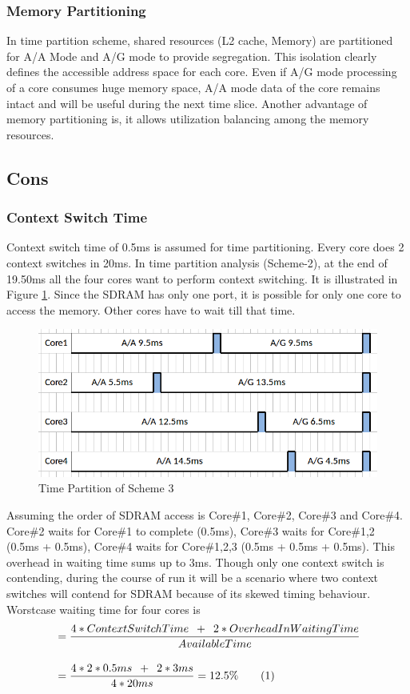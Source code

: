\subsubsection{Memory Partitioning}
In time partition scheme, shared resources (L2 cache, Memory) are partitioned for A/A Mode and A/G mode to provide segregation. This isolation clearly defines the accessible address space for each core. Even if A/G mode processing of a core consumes huge memory space, A/A mode data of the core remains intact and will be useful during the next time slice. Another advantage of memory partitioning is, it allows utilization balancing among the memory resources.

\subsection{Cons}
\label{mm:cons}
\subsubsection{Context Switch Time}
Context switch time of 0.5ms is assumed for time partitioning. Every core does 2 context switches in 20ms. In time partition analysis (Scheme-2), at the end of 19.50ms all the four cores want to perform context switching. It is illustrated in Figure \ref{fig:mm:mm_cons1}. Since the SDRAM has only one port, it is possible for only one core to access the memory. Other cores have to wait till that time. 

\begin{figure}[h!]
	\centering
	\includegraphics[width=120mm]{figures/mm_cons1}
	\caption{Time Partition of Scheme 3}
	\label{fig:mm:mm_cons1}
\end{figure}

Assuming the order of SDRAM access is Core\#1, Core\#2, Core\#3 and Core\#4. Core\#2 waits for Core\#1 to complete (0.5ms), Core\#3 waits for Core\#1,2 (0.5ms + 0.5ms), Core\#4 waits for Core\#1,2,3 (0.5ms + 0.5ms + 0.5ms). This overhead in waiting time sums up to 3ms. Though only one context switch is contending, during the course of run it will be a scenario where two context switches will contend for SDRAM because of its skewed timing behaviour. Worstcase waiting time for four cores is 
\begin{align*}
	& = \frac{4*ContextSwitchTime \enspace + \enspace 2*OverheadInWaitingTime}{AvailableTime} \\[0.4cm]
	& = \frac{4*2*0.5ms \enspace + \enspace 2*3ms}{4*20ms} = 12.5\% \stepcounter{equation}\tag{\theequation} 
\end{align*}

